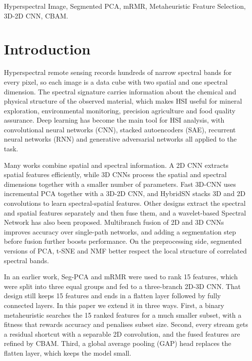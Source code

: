 \documentclass[conference]{IEEEtran}
\begin{document}
	\begin{IEEEkeywords}
		Hyperspectral Image, Segmented PCA, mRMR, Metaheuristic Feature Selection, 3D-2D CNN, CBAM.
	\end{IEEEkeywords}
	
	\section{Introduction}
	Hyperspectral remote sensing records hundreds of narrow spectral bands for every pixel, so each image is a data cube with two spatial and one spectral dimension. The spectral signature carries information about the chemical and physical structure of the observed material, which makes HSI useful for mineral exploration, environmental monitoring, precision agriculture and food quality assurance. Deep learning has become the main tool for HSI analysis, with convolutional neural networks (CNN)\cite{cnn14}, stacked autoencoders (SAE)\cite{sae8}, recurrent neural networks (RNN)\cite{rnn16} and generative adversarial networks\cite{gan19} all applied to the task.
	
	Many works combine spatial and spectral information. A 2D CNN extracts spatial features efficiently\cite{makantis}, while 3D CNNs process the spatial and spectral dimensions together with a smaller number of parameters\cite{Hamida}. Fast 3D-CNN\cite{compact} uses incremental PCA together with a 3D-2D CNN, and HybridSN\cite{hybridsn} stacks 3D and 2D convolutions to learn spectral-spatial features. Other designs extract the spectral and spatial features separately and then fuse them\cite{guo,li}, and a wavelet-based Spectral Network has also been proposed\cite{spectral}. Multibranch fusion of 2D and 3D CNNs\cite{multibranch} improves accuracy 
	over single-path networks, and adding a segmentation step before fusion 
	further boosts performance\cite{multibranch2}. On the preprocessing side, segmented versions of PCA\cite{spca}, t-SNE\cite{stsne} and NMF\cite{snmf} better respect the local structure of correlated spectral bands.
	
	In an earlier work\cite{ahmed2024}, Seg-PCA and mRMR were used to rank 
	15 features, which were split into three equal groups and fed to a 
	three-branch 2D-3D CNN. That design still keeps 15 features and ends in a 
	flatten layer followed by fully connected layers. In this paper we extend it in three ways. First, a binary metaheuristic searches the 15 ranked features for a much smaller subset, with a fitness that rewards accuracy and penalises subset size. Second, every stream gets a residual shortcut with a separable 2D convolution, and the fused features are refined by CBAM\cite{cbam}. Third, a global average pooling (GAP) head replaces the flatten layer, which keeps the model small.
	
\end{document}
